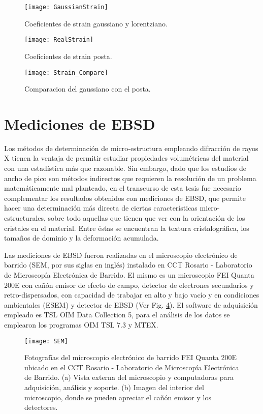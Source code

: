 \begin{figure}[!htb]
  \centering
  \texttt{[image: GaussianStrain]}
  \caption{Coeficientes de strain gaussiano y lorentziano.}
  \label{fig:GaussStrainn}
\end{figure}

\begin{figure}[!htb]
  \centering
  \texttt{[image: RealStrain]}
  \caption{Coeficientes de strain posta.}
  \label{fig:RealStrain}
\end{figure}

\begin{figure}[!htb]
  \centering
  \texttt{[image: Strain\_Compare]}
  \caption{Comparacion del gaussiano con el posta.}
  \label{fig:RealvsGauss}
\end{figure}

\newpage
\fi
\section{Mediciones de EBSD}\label{S:MatEBSD}
Los métodos de determinación de micro-estructura empleando difracción de rayos X tienen la ventaja de permitir estudiar propiedades volumétricas del material con una estadística más que razonable.
Sin embargo, dado que los estudios de ancho de pico son métodos indirectos que requieren la resolución de un problema matemáticamente mal planteado, en el transcurso de esta tesis fue necesario complementar los resultados obtenidos con mediciones de EBSD, que permite hacer una determinación más directa de ciertas características micro-estructurales, sobre todo aquellas que tienen que ver con la orientación de los cristales en el material.
Entre éstas se encuentran la textura cristalográfica, los tamaños de dominio y la deformación acumulada.

Las mediciones de EBSD fueron realizadas en el microscopio electrónico de barrido (SEM, por sus siglas en inglés) instalado en CCT Rosario - Laboratorio de Microscopía Electrónica de Barrido.
El mismo es un microscopio FEI Quanta 200E con cañón emisor de efecto de campo, detector de electrones secundarios y retro-dispersados, con capacidad de trabajar en alto y bajo vacío y en condiciones ambientales (ESEM) y detector de EBSD (Ver Fig. \ref{fig:SEM}).
El software de adquisición empleado es TSL OIM Data Collection 5, para el análisis de los datos se emplearon los programas OIM TSL 7.3 y MTEX.

\begin{figure}[!htb]
  \centering
  \texttt{[image: SEM]}
  \caption{Fotografías del microscopio electrónico de barrido FEI Quanta 200E ubicado en el CCT Rosario - Laboratorio de Microscopía Electrónica de Barrido. (a) Vista externa del microscopio y computadoras para adquisición, análisis y soporte. (b) Imagen del interior del microscopio, donde se pueden apreciar el cañón emisor y los detectores.}
  \label{fig:SEM}
\end{figure}

